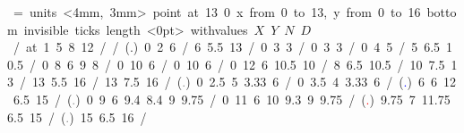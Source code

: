 \mbox{\beginpicture
\headingtoplotskip=\baselineskip
\setcoordinatesystem units <4mm, 3mm> point at 13 0
\setplotarea x from 0 to 13, y from 0 to 16
\axis bottom invisible ticks length <0pt>
  withvalues {$X$} {$Y$} {$N$} {$D$} /  at 1 5 8 12 / /
\setplotsymbol ({\normalsize .})
 0 2 6 / %
 6 5.5 13 / %
 0 3 3 / %
 0 3 3 / %
 0 4 5 / %
 5 6.5 10.5 / %
 0 8 6 9 8 / %
 0 10 6 / %
 0 10 6 / %
 0 12 6 10.5 10 / %
 8 6.5 10.5 / %
 10 7.5 13 / %
 13 5.5 16 / %
 13 7.5 16 / %
\setplotsymbol ({\textcolor{gray}{\scriptsize .}})
 0 2.5 5 3.33 6 / %
 0 3.5 4 3.33 6 / %
\setplotsymbol ({\textcolor{blue}{\scriptsize .}})
 6 6 12 6.5 15 / %
\setplotsymbol ({\textcolor{gray}{\scriptsize .}})
 0 9 6 9.4 8.4 9 9.75 / %
 0 11 6 10 9.3 9 9.75 / %
\setplotsymbol ({\textcolor{red}{\scriptsize .}})
 9.75 7 11.75 6.5 15 / %
\setplotsymbol ({\textcolor{gray}{\scriptsize .}})
 15 6.5 16 / %
\endpicture}

